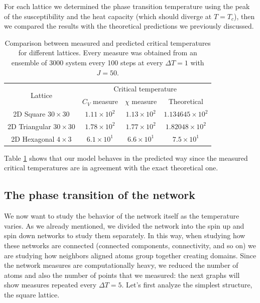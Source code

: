 For each lattice we determined the phase transition temperature using the peak of the susceptibility and the heat capacity (which should diverge at $T=T_c$), then we compared the results with the theoretical predictions we previously discussed.
\begin{table}[!htbp]
    \centering
    \label{Tab:Check}
    \begin{tabular}{cccc}
        \toprule
        \multirow{2}{*}{Lattice} & \multicolumn{3}{c}{Critical temperature} \\
         \cmidrule(lr){2-4}
        & $C_V$ measure &  $\chi$ measure & Theoretical \\
        \midrule
        2D Square $30\times30$ & $1.11\times10^{2}$ & $1.13\times10^{2}$ & $1.134645\times10^{2}$ \\
        2D Triangular $30\times30$ & $1.78\times10^{2}$ & $1.77\times10^{2}$ & $1.82048\times10^{2}$ \\
        2D Hexagonal $4\times3$ & $6.1\times10^1$ & $6.6\times10^1$ & $7.5\times10^1$ \\
        \bottomrule
    \end{tabular}
    \caption{Comparison between measured and predicted critical temperatures for different lattices. Every measure was obtained from an ensemble of 3000 system every 100 steps at every $\Delta T=1$ with $J=50$.}
\end{table}

Table \ref{Tab:Check} shows that our model behaves in the predicted way since the measured critical temperatures are in agreement with the exact theoretical one. 

\subsection{The phase transition of the network}
We now want to study the behavior of the network itself as the temperature varies. As we already mentioned, we divided the network into the spin up and spin down networks to study them separately. In this way, when studying how these networks are connected (connected components, connectivity, and so on) we are studying how neighbors aligned atoms group together creating domains. Since the network measures are computationally heavy, we reduced the number of atoms and also the number of points that we measured: the next graphs will show measures repeated every $\Delta T=5$. Let's first analyze the simplest structure, the square lattice.


